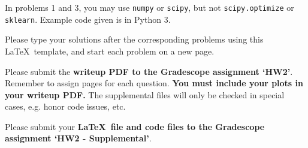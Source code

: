 \documentclass[submit]{harvardml}
\begin{document}
In problems 1 and 3, you may use \texttt{numpy} or \texttt{scipy}, but
not \texttt{scipy.optimize} or \texttt{sklearn}. Example code given is
in Python 3.

Please type your solutions after the corresponding problems using this
\LaTeX\ template, and start each problem on a new page.

Please submit the \textbf{writeup PDF to the Gradescope assignment `HW2'}. Remember to assign pages for each question.  \textbf{You must include your plots in your writeup PDF. } The supplemental files will only be checked in special cases, e.g. honor code issues, etc.

Please submit your \textbf{\LaTeX\ file and code files to the Gradescope assignment `HW2 - Supplemental'}. 

\end{document}
